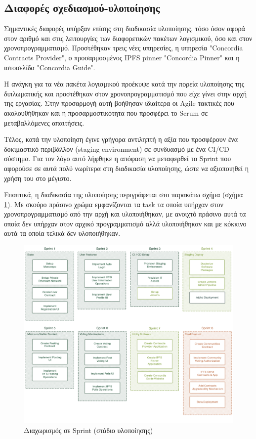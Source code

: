 \subsection{Διαφορές σχεδιασμού-υλοποίησης} \label{subsection:4-5-1-design-implementation-differences}

Σημαντικές διαφορές υπήρξαν επίσης στη διαδικασία υλοποίησης, τόσο όσον αφορά στον αριθμό και στις λειτουργίες των διαφορετικών πακέτων λογισμικού, όσο και στον χρονοπρογραμματισμό. Προστέθηκαν τρεις νέες υπηρεσίες, η υπηρεσία "Concordia Contracts Provider", ο προσαρμοσμένος IPFS pinner "Concordia Pinner" και η ιστοσελίδα "Concordia Guide".

Η ανάγκη για τα νέα πακέτα λογισμικού προέκυψε κατά την πορεία υλοποίησης της διπλωματικής και προστέθηκαν στον χρονοπρογραμματισμό που είχε γίνει στην αρχή της εργασίας. Στην προσαρμογή αυτή βοήθησαν ιδιαίτερα οι Agile τακτικές που ακολουθήθηκαν και η προσαρμοστικότητα που προσφέρει το Scrum σε μεταβαλλόμενες απαιτήσεις.

Τέλος, κατά την υλοποίηση έγινε γρήγορα αντιληπτή η αξία που προσφέρουν ένα δοκιμαστικό περιβάλλον (staging environment) σε συνδυασμό με ένα CI/CD σύστημα. Για τον λόγο αυτό λήφθηκε η απόφαση να μεταφερθεί το Sprint που αφορούσε σε αυτά πολύ νωρίτερα στη διαδικασία υλοποίησης, ώστε να αξιοποιηθεί η χρήση του στο μέγιστο.

Εποπτικά, η διαδικασία της υλοποίησης περιγράφεται στο παρακάτω σχήμα (σχήμα \ref{figure:4.5.design-implementation-differences-sprints}). Με σκούρο πράσινο χρώμα εμφανίζονται τα task τα οποία υπήρχαν στον χρονοπρογραμματισμό από την αρχή και υλοποιήθηκαν, με ανοιχτό πράσινο αυτά τα οποία δεν υπήρχαν στον αρχικό προγραμματισμό αλλά υλοποιήθηκαν και με κόκκινο αυτά τα οποία τελικά δεν υλοποιήθηκαν.

\vspace{\baselineskip}

\begin{figure}[H]
    \centering
    \includegraphics[width=\textwidth]{assets/figures/chapter-4/4.6.design-implementation-differences-sprints.png}
    \caption{Διαχωρισμός σε Sprint (στάδιο υλοποίησης)}
    \label{figure:4.5.design-implementation-differences-sprints}
\end{figure}
